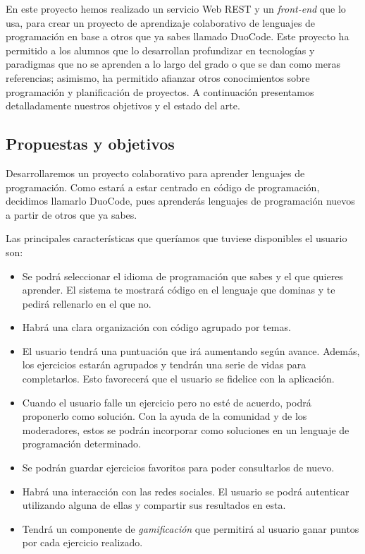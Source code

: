 
En este proyecto hemos realizado un servicio Web REST y un \emph{front-end} que lo usa, para crear un proyecto de aprendizaje colaborativo de lenguajes de programación en base a otros que ya sabes llamado DuoCode. Este proyecto ha permitido a los alumnos que lo desarrollan profundizar en tecnologías y paradigmas que no se aprenden a lo largo del grado o que se dan como meras referencias; asimismo, ha
permitido afianzar otros conocimientos sobre programación y planificación de proyectos.
A continuación presentamos detalladamente nuestros objetivos y el estado del arte.

\subsection{Propuestas y objetivos\label{subsec:introduction}}

Desarrollaremos un proyecto colaborativo para aprender lenguajes de programación. Como estará a estar centrado en código de programación, decidimos llamarlo DuoCode, pues aprenderás lenguajes de programación nuevos a partir de otros que ya sabes. 

Las principales características que queríamos que tuviese disponibles el usuario son:

\begin{itemize}
\item
Se podrá seleccionar el idioma de programación que sabes y el que quieres aprender. El sistema te mostrará código en el lenguaje que dominas y te pedirá rellenarlo en el que no.

\item
Habrá una clara organización con código agrupado por temas.

\item
El usuario tendrá una puntuación que irá aumentando según avance. Además, los ejercicios estarán agrupados y tendrán una serie de vidas para completarlos. Esto favorecerá  que el usuario se fidelice con la aplicación.

\item
Cuando el usuario falle un ejercicio pero no esté de acuerdo, podrá proponerlo como solución. Con la ayuda de la comunidad y de los moderadores, estos se podrán incorporar como soluciones en un lenguaje de programación determinado.

\item
Se podrán guardar ejercicios favoritos para poder consultarlos de nuevo.

\item
Habrá una interacción con las redes sociales. El usuario se podrá autenticar utilizando alguna de ellas y compartir sus resultados en esta.

\item
Tendrá un componente de \emph{gamificación} que permitirá al usuario ganar puntos por cada ejercicio realizado.
\end{itemize}

